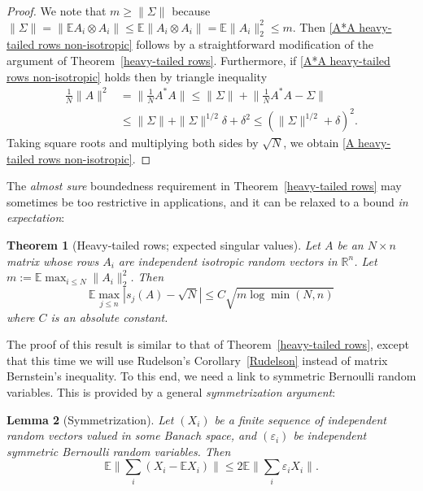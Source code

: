 \documentclass[10pt, openany]{book}
\newtheorem{theorem}{Theorem}[chapter]
\newtheorem{lemma}[theorem]{Lemma}
\theoremstyle{remark}
\def \R {\mathbb{R}}
\def \E {\mathbb{E}}
\def \e {\varepsilon}
\def \d {\delta}
\begin{document}
\begin{proof}
We note that $m \ge \|\Sigma\|$ because 
$\|\Sigma\| = \|\E A_i \otimes A_i\| \le \E \|A_i \otimes A_i\| = \E \|A_i\|_2^2 \le m$. 
Then \eqref{A*A heavy-tailed rows non-isotropic} follows by a straightforward modification of the argument
of Theorem~\ref{heavy-tailed rows}. Furthermore, if \eqref{A*A heavy-tailed rows non-isotropic} holds then
by triangle inequality
\begin{align*}
\frac{1}{N} \|A\|^2 
&= \big\| \frac{1}{N} A^*A \big\|
\le \|\Sigma\| + \big\| \frac{1}{N}A^*A-\Sigma \big\| \\
&\le \|\Sigma\| + \|\Sigma\|^{1/2}\d + \d^2 
\le (\|\Sigma\|^{1/2} + \d)^2. 
\end{align*}
Taking square roots and multiplying both sides by $\sqrt{N}$, we obtain \eqref{A heavy-tailed rows non-isotropic}.
\end{proof}


\bigskip

The {\em almost sure} boundedness requirement in Theorem~\ref{heavy-tailed rows} may sometimes be too
restrictive in applications, and it can be relaxed to a bound {\em in expectation}:

\begin{theorem}[Heavy-tailed rows; expected singular values]					\label{heavy-tailed rows exp si}
  Let $A$ be an $N \times n$ matrix whose rows $A_i$ are independent
  isotropic random vectors in $\R^n$. Let 
  $m := \E \max_{i \le N} \|A_i\|_2^2$. Then
  $$
  \E \max_{j \le n} |s_j(A) - \sqrt{N}|
  \le C \sqrt{m \log \min(N,n)}
  $$
  where $C$ is an absolute constant.
\end{theorem}

The proof of this result is similar to that of Theorem~\ref{heavy-tailed rows}, except that this time
we will use Rudelson's Corollary~\ref{Rudelson} instead of matrix Bernstein's inequality.
To this end, we need a link to symmetric Bernoulli random variables. This is provided by 
a general {\em symmetrization argument}: 

\begin{lemma}[Symmetrization] 				\label{symmetrization}
  Let $(X_i)$ be a finite sequence of independent random vectors valued in some Banach space,
  and $(\e_i)$ be independent symmetric Bernoulli random variables. 
  Then 
  \begin{equation}							\label{eq symmetrization}
  \E \Big\| \sum_i (X_i - \E X_i) \Big\|
  \le 2 \E \Big\| \sum_i \e_i X_i \Big\|.
  \end{equation}
\end{lemma}
\end{document}
